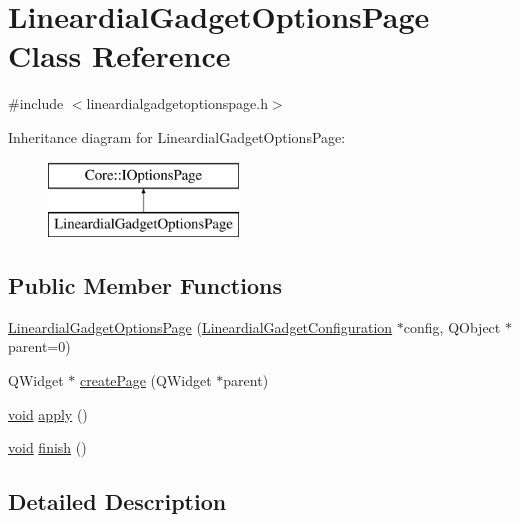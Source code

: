 \hypertarget{class_lineardial_gadget_options_page}{\section{\-Lineardial\-Gadget\-Options\-Page \-Class \-Reference}
\label{class_lineardial_gadget_options_page}
}


{\ttfamily \#include $<$lineardialgadgetoptionspage.\-h$>$}

\-Inheritance diagram for \-Lineardial\-Gadget\-Options\-Page\-:\begin{figure}[H]
\begin{center}
\leavevmode
\includegraphics[height=2.000000cm]{class_lineardial_gadget_options_page}
\end{center}
\end{figure}
\subsection*{\-Public \-Member \-Functions}
\begin{DoxyCompactItemize}
\item 
\hyperlink{group___linear_dial_plugin_gaa49909f8404b5303882872f6bb8ccdb2}{\-Lineardial\-Gadget\-Options\-Page} (\hyperlink{class_lineardial_gadget_configuration}{\-Lineardial\-Gadget\-Configuration} $\ast$config, \-Q\-Object $\ast$parent=0)
\item 
\-Q\-Widget $\ast$ \hyperlink{group___linear_dial_plugin_ga7498a19341fff9fe87afe47efb379a00}{create\-Page} (\-Q\-Widget $\ast$parent)
\item 
\hyperlink{group___u_a_v_objects_plugin_ga444cf2ff3f0ecbe028adce838d373f5c}{void} \hyperlink{group___linear_dial_plugin_gace7e2623dbc910a445c0f4f772fb85cb}{apply} ()
\item 
\hyperlink{group___u_a_v_objects_plugin_ga444cf2ff3f0ecbe028adce838d373f5c}{void} \hyperlink{group___linear_dial_plugin_ga5afd30269776667128093b5ec5bef9de}{finish} ()
\end{DoxyCompactItemize}


\subsection{\-Detailed \-Description}


